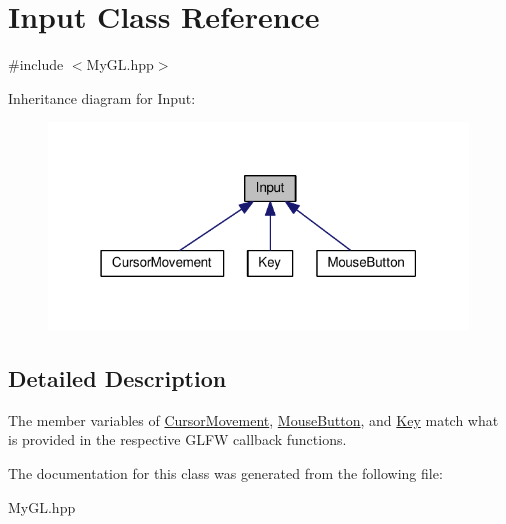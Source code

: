 \hypertarget{classInput}{}\section{Input Class Reference}
\label{classInput}


{\ttfamily \#include $<$My\+G\+L.\+hpp$>$}



Inheritance diagram for Input\+:
\nopagebreak
\begin{figure}[H]
\begin{center}
\leavevmode
\includegraphics[width=316pt]{classInput__inherit__graph}
\end{center}
\end{figure}


\subsection{Detailed Description}
The member variables of \hyperlink{classCursorMovement}{Cursor\+Movement}, \hyperlink{classMouseButton}{Mouse\+Button}, and \hyperlink{classKey}{Key} match what is provided in the respective G\+L\+FW callback functions. 

The documentation for this class was generated from the following file\+:\begin{DoxyCompactItemize}
\item 
My\+G\+L.\+hpp\end{DoxyCompactItemize}
